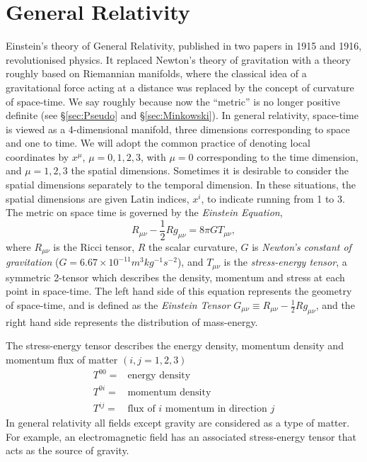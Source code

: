 %

%

\chapter{General Relativity}

Einstein's theory of General Relativity, published in two papers in 1915 and 1916, revolutionised physics. It replaced Newton's theory of gravitation with a theory roughly based on Riemannian manifolds, where the classical idea of a gravitational force acting at a distance was replaced by the concept of curvature of space-time. We say roughly because now the ``metric'' is no longer positive definite (see {\S}\ref{sec:Pseudo} and {\S}\ref{sec:Minkowski}). In general relativity, space-time is viewed as a 4-dimensional manifold, three dimensions corresponding to space and one to time. We will adopt the common practice of denoting local coordinates by $x^\mu$, $\mu=0,1,2,3$, with $\mu=0$ corresponding to the time dimension, and $\mu=1,2,3$ the spatial dimensions. Sometimes it is desirable to consider the spatial dimensions separately to the temporal dimension. In these situations, the spatial dimensions are given Latin indices, $x^i$, to indicate running from 1 to 3. \\

The metric on space time is governed by the \textit{Einstein Equation},
\begin{equation}
R_{\mu \nu}-\frac{1}{2}Rg_{\mu \nu} = 8\pi G T_{\mu \nu}, 
\label{eq:Einstein} 
\end{equation} 
where $R_{\mu \nu}$ is the Ricci tensor, $R$ the scalar curvature, $G$ is \textit{Newton's constant of gravitation} ($G=6.67\times10^{-11} m^{3}kg^{-1}s^{-2}$), and $T_{\mu \nu}$ is the \textit{stress-energy tensor}, a symmetric 2-tensor which describes the density, momentum and stress at each point in space-time. The left hand side of this equation represents the geometry of space-time, and is defined as the \textit{Einstein Tensor} $G_{\mu \nu} \equiv R_{\mu \nu}-\frac{1}{2}Rg_{\mu \nu}$, and the right hand side represents the distribution of mass-energy. 

The stress-energy tensor describes the energy density, momentum density and momentum flux of matter $(i,j=1,2,3)$
\begin{eqnarray*}
T^{00} =& \mbox{energy density}\\
T^{0i} =& \mbox{momentum density}\\
T^{ij} =& \mbox{flux of $i$ momentum in direction $j$}
\end{eqnarray*}
In general relativity all fields except gravity are considered as a type of matter. For example, an electromagnetic field has an associated stress-energy tensor that acts as the source of gravity.

